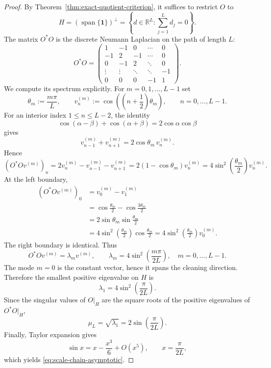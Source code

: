 \documentclass[11pt]{article}
\numberwithin{equation}{section}
\newcommand{\R}{\mathbb R}
\begin{document}
\begin{proof}
By Theorem~\ref{thm:exact-quotient-criterion}, it suffices to restrict $O$ to
\[
    H=(\operatorname{span}\{\mathbf 1\})^\perp
    =
    \left\{d\in\R^L:\sum_{j=1}^L d_j=0\right\}.
\]
The matrix $O^*O$ is the discrete Neumann Laplacian on the path of length $L$:
\[
O^*O=
\begin{pmatrix}
1 & -1 & 0 & \cdots & 0\\
-1 & 2 & -1 & \cdots & 0\\
0 & -1 & 2 & \ddots & 0\\
\vdots & \vdots & \ddots & \ddots & -1\\
0 & 0 & 0 & -1 & 1
\end{pmatrix}.
\]
We compute its spectrum explicitly.  For $m=0,1,\ldots,L-1$ set
\[
    \theta_m:=\frac{m\pi}{L},
    \qquad
    v^{(m)}_n
    :=
    \cos\left(\left(n+\frac12\right)\theta_m\right),
    \qquad n=0,\ldots,L-1.
\]
For an interior index $1\le n\le L-2$, the identity
\[
    \cos(\alpha-\beta)+\cos(\alpha+\beta)
    =2\cos\alpha\cos\beta
\]
gives
\[
    v^{(m)}_{n-1}+v^{(m)}_{n+1}
    =2\cos\theta_m\,v^{(m)}_n.
\]
Hence
\[
    (O^*Ov^{(m)})_n
    =2v^{(m)}_n-v^{(m)}_{n-1}-v^{(m)}_{n+1}
    =2(1-\cos\theta_m)v^{(m)}_n
    =4\sin^2\left(\frac{\theta_m}{2}\right)v^{(m)}_n.
\]
At the left boundary,
\begin{align*}
    (O^*Ov^{(m)})_0
    &=v^{(m)}_0-v^{(m)}_1  \\
    &=\cos\frac{\theta_m}{2}-\cos\frac{3\theta_m}{2}\\
    &=2\sin\theta_m\sin\frac{\theta_m}{2}\\
    &=4\sin^2\left(\frac{\theta_m}{2}\right)\cos\frac{\theta_m}{2}
      =4\sin^2\left(\frac{\theta_m}{2}\right)v^{(m)}_0.
\end{align*}
The right boundary is identical.  Thus
\[
    O^*Ov^{(m)}
    =
    \lambda_m v^{(m)},
    \qquad
    \lambda_m=4\sin^2\left(\frac{m\pi}{2L}\right),
    \quad m=0,\ldots,L-1.
\]
The mode $m=0$ is the constant vector, hence it spans the cleaning direction.  Therefore the smallest positive eigenvalue on $H$ is
\[
    \lambda_1=4\sin^2\left(\frac{\pi}{2L}\right).
\]
Since the singular values of $O|_H$ are the square roots of the positive eigenvalues of $O^*O|_H$,
\[
    \mu_L=\sqrt{\lambda_1}=2\sin\left(\frac{\pi}{2L}\right).
\]
Finally, Taylor expansion gives
\[
    \sin x=x-\frac{x^3}{6}+O(x^5),
    \qquad x=\frac{\pi}{2L},
\]
which yields \eqref{eq:scale-chain-asymptotic}.
\end{proof}
\end{document}
